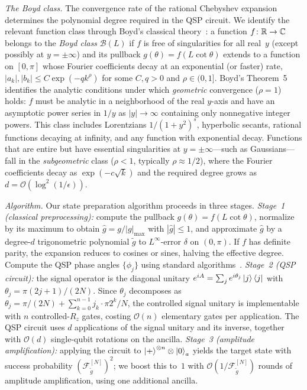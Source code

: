 \textit{The Boyd class.}
The convergence rate of the rational Chebyshev expansion
determines the polynomial degree required in the QSP circuit.
We identify the relevant function class through Boyd's
classical theory~\cite{Boyd1990}: a function
$f\colon \mathbb{R} \to \mathbb{C}$ belongs to the \emph{Boyd class}
$\mathcal{B}(L)$ if $f$ is free of singularities for all
real~$y$ (except possibly at $y = \pm\infty$) and its pullback
$g(\theta) = f(L\cot\theta)$ extends to a function on
$[0,\pi]$ whose Fourier coefficients decay at an exponential
(or faster) rate,
$|a_k|, |b_k| \leq C\exp(-qk^{\rho})$ for some
$C, q > 0$ and $\rho \in (0,1]$.  Boyd's
Theorem~5~\cite{Boyd1990} identifies the analytic conditions
under which \emph{geometric} convergence ($\rho = 1$) holds:
$f$ must be analytic in a neighborhood of the real $y$-axis and
have an asymptotic power series in $1/y$ as $|y| \to \infty$
containing only nonnegative integer powers.  This class includes
Lorentzians $1/(1+y^2)^s$, hyperbolic secants, rational
functions decaying at infinity, and any function with
exponential decay.  Functions that are entire but have essential
singularities at $y = \pm\infty$---such as Gaussians---fall in
the \emph{subgeometric} class ($\rho < 1$, typically
$\rho \approx 1/2$), where the Fourier coefficients decay as
$\exp(-c\sqrt{k})$ and the required degree grows as
$d = \mathcal{O}(\log^2(1/\epsilon))$.

\textit{Algorithm.}
Our state preparation algorithm proceeds in three stages.
\emph{Stage~1 (classical preprocessing):} compute the pullback
$g(\theta) = f(L\cot\theta)$, normalize by its maximum to
obtain $\hat{g} = g/|g|_{\max}$ with $|\hat{g}| \leq 1$, and
approximate $\hat{g}$ by a degree-$d$ trigonometric polynomial
$\tilde{g}$ to $L^\infty$-error $\delta$ on $(0,\pi)$.
If $f$ has definite parity, the expansion reduces to cosines or
sines, halving the effective degree.  Compute the QSP phase
angles $\{\phi_j\}$ using standard
algorithms~\cite{DongMengWhaleyEtAl2021,Haah2019}.
\emph{Stage~2 (QSP circuit):} the signal operator is
the diagonal unitary
$e^{iA} = \sum_j e^{i\theta_j}\ket{j}\bra{j}$ with
$\theta_j = \pi(2j+1)/(2N)$.  Since $\theta_j$ decomposes
as $\theta_j = \pi/(2N) + \sum_{k=0}^{n-1} j_k \cdot \pi 2^k/N$, the
controlled signal unitary is implementable with $n$
controlled-$R_z$ gates, costing $\mathcal{O}(n)$ elementary
gates per application.  The QSP circuit uses $d$
applications of the signal unitary and its inverse, together
with $\mathcal{O}(d)$ single-qubit rotations on the ancilla.
\emph{Stage~3 (amplitude amplification):} applying the circuit
to $\ket{+}^{\otimes n}\otimes\ket{0}_a$ yields the target
state with success probability
$(\mathcal{F}_{\tilde{g}}^{[N]})^2$; we boost this to~$1$
with $\mathcal{O}(1/\mathcal{F}_{\tilde{g}}^{[N]})$ rounds of
amplitude amplification, using one additional ancilla.

